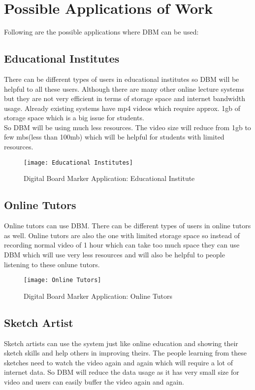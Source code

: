 \section{Possible Applications of Work}
Following are the possible applications where DBM can be used:
\bigskip

\subsection{Educational Institutes}
There can be different types of users in educational institutes so DBM will be helpful to all these users. Although there are many other online lecture systems but they are not very efficient in terms of storage space and internet bandwidth usage. Already existing systems have mp4 videos which require approx. 1gb of storage space which is a big issue for students.\\
So DBM will be using much less resources. The video size will reduce from 1gb to few mbs(less than 100mb) which will be helpful for students with limited resources.
\bigskip

\begin{figure}[h]
  \centering
  \texttt{[image: Educational Institutes]}
  \caption{Digital Board Marker Application: Educational Institute}
\end{figure}
\bigskip


\subsection{Online Tutors}
Online tutors can use DBM. There can be different types of users in online tutors as well. Online tutors are also the one with limited storage space so instead of recording normal video of 1 hour which can take too much space they can use DBM which will use very less resources and will also be helpful to people listening to these onlune tutors.

\bigskip

\begin{figure}[h]
  \centering
  \texttt{[image: Online Tutors]}
  \caption{Digital Board Marker Application: Online Tutors}
\end{figure}

\bigskip
\newpage


\subsection{Sketch Artist}
Sketch artists can use the system just like online education and showing their sketch skills and help others in improving theirs. The people learning from these sketches need to watch the video again and again which will require a lot of internet data. So DBM will reduce the data usage as it has very small size for video and users can easily buffer the video again and again.
\bigskip


